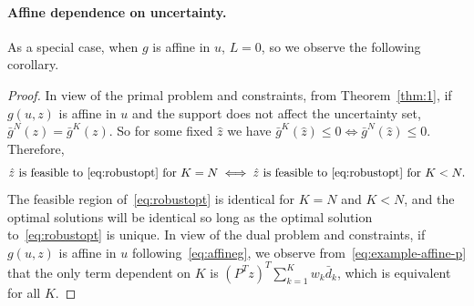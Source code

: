 {\paragraph{Affine dependence on uncertainty.}%
As a special case, when $g$ is affine in $u$, $L = 0$, so we observe the following corollary.
\begin{corollary}
	\label{cor:affine}
\end{corollary}
\begin{proof}
In view of the primal problem and constraints, from Theorem~\ref{thm:1}, if $g(u,z)$ is affine in $u$ and the support does not affect the uncertainty set, $\bar{g}^N(z) = \bar{g}^K(z)$.
So for some fixed $\hat{z}$ we have ${\bar{g}^K(\hat{z}) \leq 0 \iff \bar{g}^N(\hat{z}) \leq 0}$. Therefore,
\[
    \hat{z} \text{ is feasible to~\eqref{eq:robustopt} for $K = N$} \iff \hat{z} \text{ is feasible to~\eqref{eq:robustopt} for $K < N.$}
\]
The feasible region of~\eqref{eq:robustopt} is identical for $K=N$ and $K < N$, and the optimal solutions will be identical so long as the optimal solution to~\eqref{eq:robustopt} is unique.
In view of the dual problem and constraints, if $g(u,z)$ is affine in $u$ following~\eqref{eq:affineg}, we observe from~\eqref{eq:example-affine-p} that the only term dependent on $K$ is  $(P^Tz)^T\sum_{k=1}^{K} w_k \bar{d}_k$, which is equivalent for all $K$.
\end{proof}

\reviewChanges{
}}

